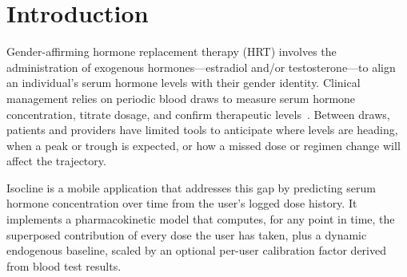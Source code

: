 \documentclass[11pt,a4paper]{article}
\begin{document}
\begin{abstract}
This revision additionally reports three defects found by re-deriving the
model from its sources rather than from its own prior statements. The
endogenous baseline is keyed to the hormone being tracked rather than to the
user's gonads, over-stating a transmasculine user's endogenous testosterone
by more than an order of magnitude at treatment onset. The per-user
calibration factor is derived against total predicted level but applied to
the exogenous term alone, so it fails to reproduce the measurement that
produced it---by up to 20\% in exactly the regime where the baseline is
largest, and where the two defects compound. And the spironolactone
clearance adjustment has no supporting human pharmacokinetic study and is
applied to the absorption exponential rather than the disposition one. All
three are stated with their magnitudes rather than repaired in the figures.
The model is honest about where its constants are primary-sourced, where
they are secondary, and where they remain uncalibrated.

\textbf{Keywords:} pharmacokinetics, Bateman function, hormone
replacement therapy, testosterone cypionate, estradiol valerate,
flip-flop kinetics, superposition, per-user calibration, mobile health
\end{abstract}

\tableofcontents
\clearpage

\section{Introduction}
\label{sec:intro}

Gender-affirming hormone replacement therapy (HRT) involves the
administration of exogenous hormones---estradiol and/or
testosterone---to align an individual's serum hormone levels with their
gender identity. Clinical management relies on periodic blood draws to
measure serum hormone concentration, titrate dosage, and confirm
therapeutic levels~\cite{hembree2017}. Between draws, patients and
providers have limited tools to anticipate where levels are heading,
when a peak or trough is expected, or how a missed dose or regimen
change will affect the trajectory.

Isocline is a mobile application that addresses this gap by predicting serum
hormone concentration over time from the user's logged dose history. It
implements a pharmacokinetic model that computes, for any point in time,
the superposed contribution of every dose the user has taken, plus a
dynamic endogenous baseline, scaled by an optional per-user calibration
factor derived from blood test results.
\end{document}
